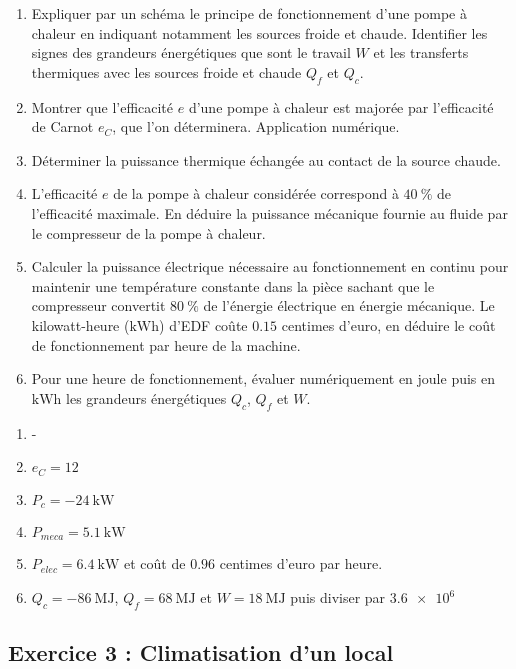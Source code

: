\begin{enumerate}
	\item Expliquer par un schéma le principe de fonctionnement d'une pompe à chaleur en indiquant notamment les sources froide et chaude. Identifier les signes des grandeurs énergétiques que sont le travail $W$ et les transferts thermiques avec les sources froide et chaude $Q_f$ et $Q_c$. 
	\item Montrer que l'efficacité $e$ d'une pompe à chaleur est majorée par l'efficacité de Carnot $e_C$, que l'on déterminera. Application numérique.
	\item Déterminer la puissance thermique échangée au contact de la source chaude.
	\item L'efficacité $e$ de la pompe à chaleur considérée correspond à $\SI{40}{\percent}$ de l'efficacité maximale. En déduire la puissance mécanique fournie au fluide par le compresseur de la pompe à chaleur.
	\item Calculer la puissance électrique nécessaire au fonctionnement en continu pour maintenir une température constante dans la pièce sachant que le compresseur convertit $\SI{80}{\percent}$ de l'énergie électrique en énergie mécanique. Le kilowatt-heure ($\unit{\kilo\watt\hour}$) d'EDF coûte $0.15$ centimes d'euro, en déduire le coût de fonctionnement par heure de la machine.
	\item Pour une heure de fonctionnement, évaluer numériquement en joule puis en $\unit{\kilo\watt\hour}$ les grandeurs énergétiques $Q_c$, $Q_f$ et $W$.
\end{enumerate}

\begin{enumerate}
	\item -
	\item $e_C = 12$
	\item $P_c = \SI{-24}{\kilo\watt}$
	\item $P_{meca} = \SI{5.1}{\kilo\watt}$
	\item $P_{elec} = \SI{6.4}{\kilo\watt}$ et coût de $0.96$ centimes d'euro par heure.
	\item $Q_c = \SI{-86}{\mega\joule}$, $Q_f = \SI{68}{\mega\joule}$ et $W = \SI{18}{\mega\joule}$ puis diviser par $\SI{3.6e6}{}$
\end{enumerate}

\subsection{Exercice 3 : Climatisation d'un local}

